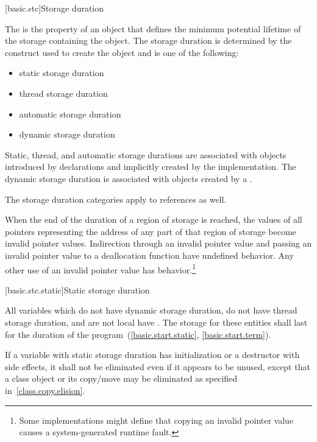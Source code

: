 [basic.stc]{Storage duration}

\pnum
{}%
The  is the property of an object that defines the minimum
potential lifetime of the storage containing the object. The storage
duration is determined by the construct used to create the object and is
one of the following:
\begin{itemize}
\item static storage duration
\item thread storage duration
\item automatic storage duration
\item dynamic storage duration
\end{itemize}

\pnum
{}%
%
%
%
Static, thread, and automatic storage durations are associated with objects
introduced by declarations and implicitly created by
the implementation. The dynamic storage duration
is associated with objects created by a
.

\pnum
The storage duration categories apply to references as well.

\pnum
When the end of the duration of a region of storage is reached,
the values of all pointers
representing the address of any part of that region of storage
become invalid pointer values.
Indirection through an invalid pointer value and
passing an invalid pointer value to a deallocation function
have undefined behavior.
Any other use of an invalid pointer value has
behavior.\footnote{Some implementations might define that
copying an invalid pointer value
causes a system-generated runtime fault.}

[basic.stc.static]{Static storage duration}

\pnum
{}%
All variables which do not have dynamic storage duration, do not have thread
storage duration, and are not local
have . The
storage for these entities shall last for the duration of the
program~(\ref{basic.start.static}, \ref{basic.start.term}).

\pnum
If a variable with static storage duration has initialization or a
destructor with side effects, it shall not be eliminated even if it
appears to be unused, except that a class object or its copy/move may be
eliminated as specified in~\ref{class.copy.elision}.

